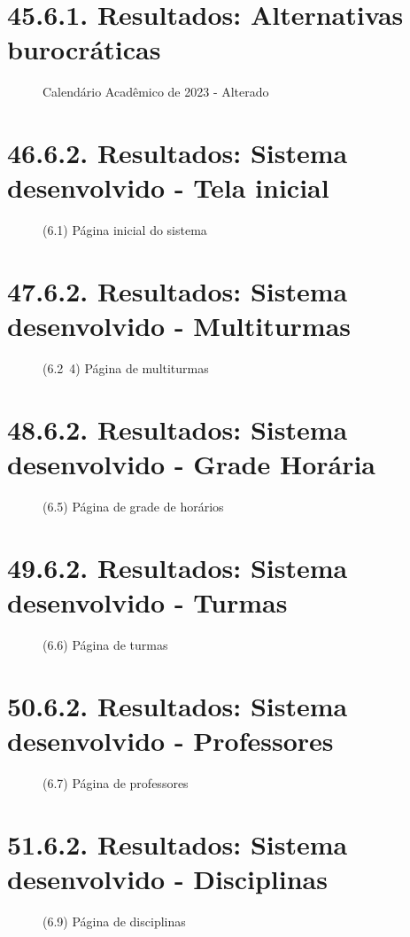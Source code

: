 \chapter{45.6.1. Resultados: Alternativas burocráticas}
\begin{figure}[htpb]\caption{Calendário Acadêmico de 2023 - Alterado}\end{figure}
\chapter*{46.6.2. Resultados: Sistema desenvolvido - Tela inicial}
\begin{figure}[htpb]\caption{(6.1) Página inicial do sistema}\end{figure}
\chapter*{47.6.2. Resultados: Sistema desenvolvido - Multiturmas}
\begin{figure}[htpb]\caption{(6.2~4) Página de multiturmas}\end{figure}
\chapter*{48.6.2. Resultados: Sistema desenvolvido - Grade Horária}
\begin{figure}[htpb]\caption{(6.5) Página de grade de horários}\end{figure}
\chapter*{49.6.2. Resultados: Sistema desenvolvido - Turmas}
\begin{figure}[htpb]\caption{(6.6) Página de turmas}\end{figure}
\chapter*{50.6.2. Resultados: Sistema desenvolvido - Professores}
\begin{figure}[htpb]\caption{(6.7) Página de professores}\end{figure}
\chapter*{51.6.2. Resultados: Sistema desenvolvido - Disciplinas}
\begin{figure}[htpb]\caption{(6.9) Página de disciplinas}\end{figure}
